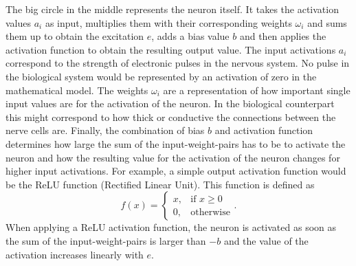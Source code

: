 The big circle in the middle represents the neuron itself. It takes the activation values $a_i$ as input, multiplies them with their corresponding weights $\omega_i$ and sums them up to obtain the excitation $e$, adds a bias value $b$ and then applies the activation function to obtain the resulting output value. The input activations $a_i$ correspond to the strength of electronic pulses in the nervous system. No pulse in the biological system would be represented by an activation of zero in the mathematical model. The weights $\omega_i$ are a representation of how important single input values are for the activation of the neuron. In the biological counterpart this might correspond to how thick or conductive the connections between the nerve cells are. Finally, the combination of bias $b$ and activation function determines how large the sum of the input-weight-pairs has to be to activate the neuron and how the resulting value for the activation of the neuron changes for higher input activations. For example, a simple output activation function would be the ReLU function (Rectified Linear Unit).
This function is defined as 
\begin{equation}
	f(x) = 
	\begin{cases}
		x, &\text{if } x\geq0 \\
		0, &\text{otherwise}
	\end{cases}.
\end{equation} 
When applying a ReLU activation function, the neuron is activated as soon as the sum of the input-weight-pairs is larger than $-b$ and the value of the activation increases linearly with $e$.
